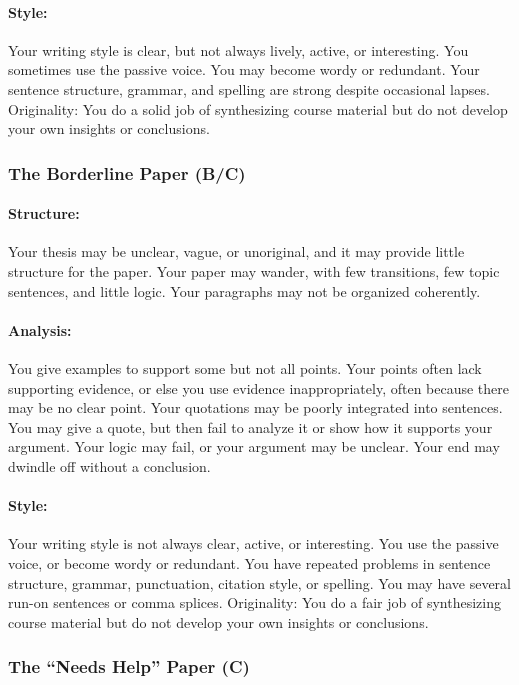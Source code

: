 \documentclass{article}
\begin{document}
\paragraph{Style:} Your writing style is clear, but not always lively, active, or interesting. You sometimes use the passive voice. You may become wordy or redundant. Your sentence structure, grammar, and spelling are strong despite occasional lapses.
Originality: You do a solid job of synthesizing course material but do not develop your own insights or conclusions.

\subsubsection{The Borderline Paper (B/C)}
\paragraph{Structure:} Your thesis may be unclear, vague, or unoriginal, and it may provide little structure for the paper. Your paper may wander, with few transitions, few topic sentences, and little logic. Your paragraphs may not be organized coherently.
\paragraph{Analysis:} You give examples to support some but not all points. Your points often lack supporting evidence, or else you use evidence inappropriately, often because there may be no clear point. Your quotations may be poorly integrated into sentences. You may give a quote, but then fail to analyze it or show how it supports your argument. Your logic may fail, or your argument may be unclear. Your end may dwindle off without a conclusion.
\paragraph{Style:} Your writing style is not always clear, active, or interesting. You use the passive voice, or become wordy or redundant. You have repeated problems in sentence structure, grammar, punctuation, citation style, or spelling. You may have several run-on sentences or comma splices.
Originality: You do a fair job of synthesizing course material but do not develop your own insights or conclusions.

\subsubsection{The ``Needs Help'' Paper (C)}
\end{document}
